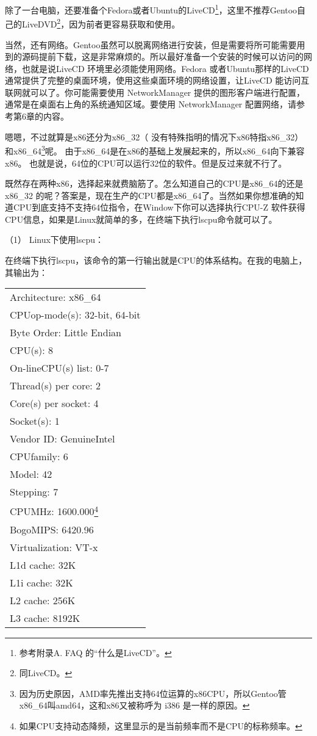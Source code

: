 \documentclass[amstex]{ctexbook}
\newenvironment{code}{\small\tt\begin{longtable}{p{0.8\textwidth}}}{\end{longtable}}
\begin{document}
除了一台电脑，还要准备个Fedora或者Ubuntu的LiveCD\footnote{参考附录A. FAQ 的“什么是LiveCD”。
}，这里不推荐Gentoo自己的LiveDVD\footnote{同LiveCD。}，因为前者更容易获取和使用。

当然，还有网络。Gentoo虽然可以脱离网络进行安装，但是需要将所可能需要用到的源码提前下载，这是非常麻烦的。所以最好准备一个安装的时候可以访问的网络，也就是说LiveCD 环境里必须能使用网络。Fedora 或者Ubuntu那样的LiveCD 通常提供了完整的桌面环境，使用这些桌面环境的网络设置，让LiveCD 能访问互联网就可以了。你可能需要使用 NetworkManager 提供的图形客户端进行配置，通常是在桌面右上角的系统通知区域。要使用 NetworkManager 配置网络，请参考第6章的内容。

嗯嗯，不过就算是x86还分为x86\_32（ 没有特殊指明的情况下x86特指x86\_32） 和x86\_64\footnote{因为历史原因，AMD率先推出支持64位运算的x86CPU，所以Gentoo管x86\_64叫amd64，这和x86又被称呼为 i386 是一样的原因。}呢。
由于x86\_64是在x86的基础上发展起来的，所以x86\_64向下兼容x86。 也就是说，64位的CPU可以运行32位的软件。但是反过来就不行了。

既然存在两种x86，选择起来就费脑筋了。怎么知道自己的CPU是x86\_64的还是x86\_32 的呢？答案是，现在生产的CPU都是x86\_64了。当然如果你想准确的知道CPU到底支持不支持64位指令，在Window下你可以选择执行CPU-Z 软件获得CPU信息，如果是Linux就简单的多，在终端下执行lscpu命令就可以了。

（1）  Linux下使用lscpu：

在终端下执行lscpu，该命令的第一行输出就是CPU的体系结构。在我的电脑上，其输出为：

\begin{code}%
Architecture:        x86\_64\\
CPUop-mode(s):        32-bit, 64-bit\\
Byte Order:            Little Endian\\
CPU(s):                8\\
On-lineCPU(s) list:   0-7\\
Thread(s) per core:    2\\
Core(s) per socket:    4\\
Socket(s):             1\\
Vendor ID:             GenuineIntel\\
CPUfamily:            6\\
Model:                 42\\
Stepping:              7\\
CPUMHz:               1600.000\footnote{如果CPU支持动态降频，这里显示的是当前频率而不是CPU的标称频率。}\\
BogoMIPS:              6420.96\\
Virtualization:        VT-x\\
L1d cache:             32K\\
L1i cache:             32K\\
L2 cache:              256K\\
L3 cache:              8192K\\
\end{code}
\end{document}
